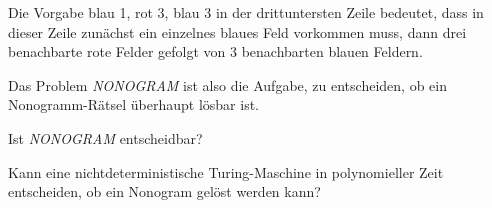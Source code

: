 \begin{center}
\end{center}
Die Vorgabe blau 1, rot 3, blau 3 in der drittuntersten Zeile bedeutet,
dass in dieser Zeile zunächst ein einzelnes blaues Feld vorkommen muss,
dann drei benachbarte rote Felder gefolgt von 3 benachbarten blauen Feldern.

Das Problem {\em NONOGRAM} ist also die Aufgabe, zu entscheiden, ob
ein Nonogramm-Rätsel überhaupt lösbar ist.
\begin{teilaufgaben}
\item Ist {\em NONOGRAM} entscheidbar?
\item Kann eine nichtdeterministische Turing-Maschine in polynomieller Zeit
entscheiden, ob ein Nonogram gelöst werden kann?
\end{teilaufgaben}


